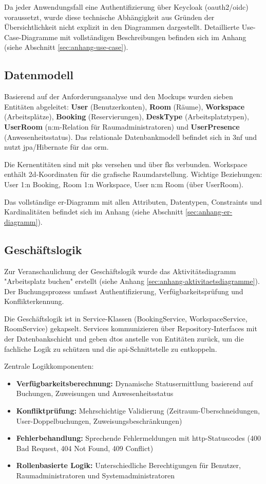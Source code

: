 \documentclass[11pt,a4paper]{report}
\begin{document}
Da jeder Anwendungsfall eine Authentifizierung über Keycloak (\gls{oauth2}/\gls{oidc}) voraussetzt, wurde diese technische Abhängigkeit aus Gründen der Übersichtlichkeit nicht explizit in den Diagrammen dargestellt. Detaillierte Use-Case-Diagramme mit vollständigen Beschreibungen befinden sich im Anhang (siehe Abschnitt \ref{sec:anhang-use-case}).

\subsection{Datenmodell}

Basierend auf der Anforderungsanalyse und den Mockups wurden sieben Entitäten abgeleitet: \textbf{User} (Benutzerkonten), \textbf{Room} (Räume), \textbf{Workspace} (Arbeitsplätze), \textbf{Booking} (Reservierungen), \textbf{DeskType} (Arbeitsplatztypen), \textbf{UserRoom} (n:m-Relation für Raumadministratoren) und \textbf{UserPresence} (Anwesenheitsstatus). Das relationale Datenbankmodell befindet sich in \gls{3nf} und nutzt \gls{jpa}/Hibernate für das \gls{orm}.

Die Kernentitäten sind mit \glspl{pk} versehen und über \glspl{fk} verbunden. Workspace enthält \gls{2d}-Koordinaten für die grafische Raumdarstellung. Wichtige Beziehungen: User 1:n Booking, Room 1:n Workspace, User n:m Room (über UserRoom).

Das vollständige \gls{er}-Diagramm mit allen Attributen, Datentypen, Constraints und Kardinalitäten befindet sich im Anhang (siehe Abschnitt \ref{sec:anhang-er-diagramm}).

\subsection{Geschäftslogik}

Zur Veranschaulichung der Geschäftslogik wurde das Aktivitätsdiagramm "Arbeitsplatz buchen" erstellt (siehe Anhang \ref{sec:anhang-aktivitaetsdiagramme}). Der Buchungsprozess umfasst Authentifizierung, Verfügbarkeitsprüfung und Konflikterkennung.

Die Geschäftslogik ist in Service-Klassen (BookingService, WorkspaceService, RoomService) gekapselt. Services kommunizieren über Repository-Interfaces mit der Datenbankschicht und geben \glspl{dto} anstelle von Entitäten zurück, um die fachliche Logik zu schützen und die \gls{api}-Schnittstelle zu entkoppeln.

Zentrale Logikkomponenten:
\begin{itemize}
    \item \textbf{Verfügbarkeitsberechnung:} Dynamische Statusermittlung basierend auf Buchungen, Zuweisungen und Anwesenheitsstatus
    \item \textbf{Konfliktprüfung:} Mehrschichtige Validierung (Zeitraum-Überschneidungen, User-Doppelbuchungen, Zuweisungsbeschränkungen)
    \item \textbf{Fehlerbehandlung:} Sprechende Fehlermeldungen mit \gls{http}-Statuscodes (400 Bad Request, 404 Not Found, 409 Conflict)
    \item \textbf{Rollenbasierte Logik:} Unterschiedliche Berechtigungen für Benutzer, Raumadministratoren und Systemadministratoren
\end{itemize}
\end{document}
